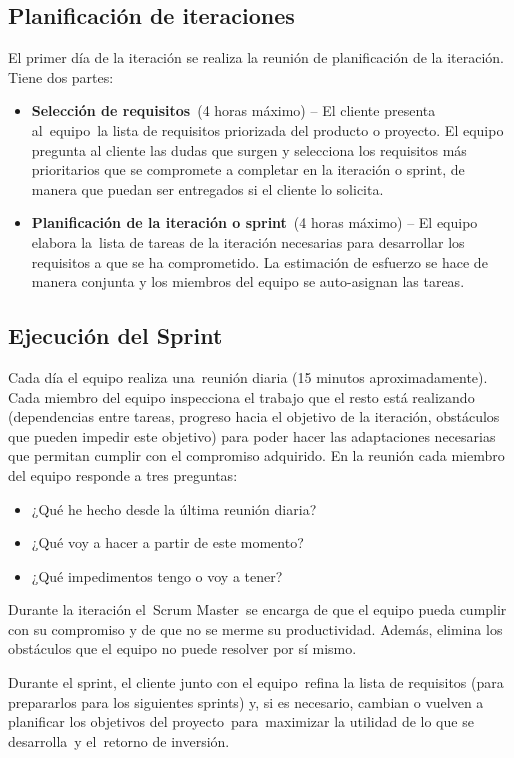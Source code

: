 \subsection{Planificación de iteraciones}
El primer día de la iteración se realiza la reunión de planificación de la iteración. Tiene dos partes:
\begin{itemize}
    \item \textbf{Selección de requisitos} (4 horas máximo) – El cliente presenta al equipo la lista de requisitos priorizada del producto o proyecto. El equipo pregunta al cliente las dudas que surgen y selecciona los requisitos más prioritarios que se compromete a completar en la iteración o sprint, de manera que puedan ser entregados si el cliente lo solicita.
    \item \textbf{Planificación de la iteración o sprint} (4 horas máximo) – El equipo elabora la lista de tareas de la iteración necesarias para desarrollar los requisitos a que se ha comprometido. La estimación de esfuerzo se hace de manera conjunta y los miembros del equipo se auto-asignan las tareas.
\end{itemize}

\subsection{Ejecución del Sprint}
Cada día el equipo realiza una reunión diaria (15 minutos aproximadamente). Cada miembro del equipo inspecciona el trabajo que el resto está realizando (dependencias entre tareas, progreso hacia el objetivo de la iteración, obstáculos que pueden impedir este objetivo) para poder hacer las adaptaciones necesarias que permitan cumplir con el compromiso adquirido. En la reunión cada miembro del equipo responde a tres preguntas:
\begin{itemize}
    \item ¿Qué he hecho desde la última reunión diaria?
    \item ¿Qué voy a hacer a partir de este momento?
    \item ¿Qué impedimentos tengo o voy a tener?
\end{itemize}
Durante la iteración el Scrum Master se encarga de que el equipo pueda cumplir con su compromiso y de que no se merme su productividad. Además, elimina los obstáculos que el equipo no puede resolver por sí mismo.

Durante el sprint, el cliente junto con el equipo refina la lista de requisitos (para prepararlos para los siguientes sprints) y, si es necesario, cambian o vuelven a planificar los objetivos del proyecto para maximizar la utilidad de lo que se desarrolla y el retorno de inversión.

